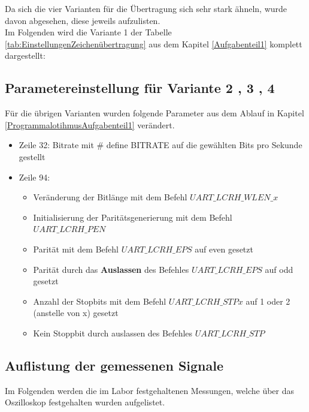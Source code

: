 	Da sich die vier Varianten für die Übertragung sich sehr stark ähneln, wurde davon abgesehen, diese jeweils aufzulisten.\\
	Im Folgenden wird die Variante 1 der Tabelle \ref{tab:EinstellungenZeichenübertragung} aus dem Kapitel \ref{Aufgabenteil1} komplett dargestellt:
	
	
	
	\newpage
	
	\subsection{Parametereinstellung für Variante 2 , 3 , 4}
	
	Für die übrigen Varianten wurden folgende Parameter aus dem Ablauf in Kapitel \ref{ProgrammalotihmusAufgabenteil1} verändert.
	\begin{itemize}
	\item []	Zeile 32: Bitrate mit \# define BITRATE auf die gewählten Bits pro Sekunde gestellt
	\item []	Zeile 94: \begin{itemize}
		\item Veränderung der Bitlänge mit dem Befehl $UART\_LCRH\_WLEN\_x$
		\item Initialisierung der Paritätsgenerierung mit dem Befehl $UART\_LCRH\_PEN$
		\item Parität mit dem Befehl $UART\_LCRH\_EPS$ auf even gesetzt
		\item Parität durch das \textbf{Auslassen} des Befehles $UART\_LCRH\_EPS$ auf odd gesetzt
		\item Anzahl der Stopbits mit dem Befehl $UART\_LCRH\_STPx$ auf 1 oder 2 (anstelle von x) gesetzt
		\item Kein Stoppbit durch auslassen des Befehles $UART\_LCRH\_STP$
	\end{itemize}
	\end{itemize}
	
	\newpage
	
	\subsection{Auflistung der gemessenen Signale}\label{GemessenesT}
	
	Im Folgenden werden die im Labor festgehaltenen Messungen, welche über das Oszilloskop festgehalten wurden aufgelistet.
	
